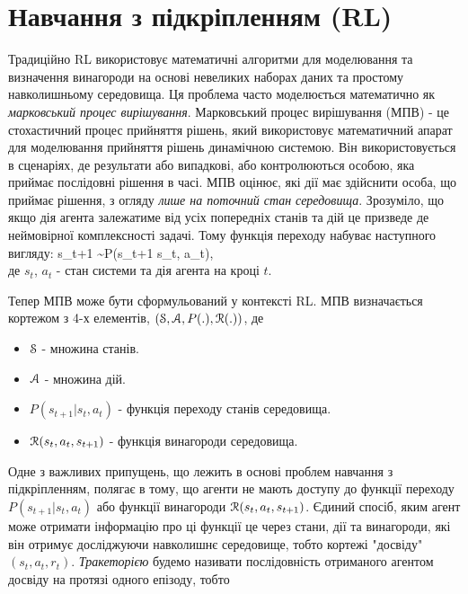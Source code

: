 \section{Навчання з підкріпленням (RL)}
  \setcounter{equation}{0}
 \setcounter{theorem}{0}
 \par  Традиційно RL використовує математичні алгоритми для моделювання та 
  визначення винагороди на основі невеликих наборах даних та простому навколишньому
  середовища. Ця проблема часто моделюється ма\-те\-ма\-тич\-но як {\em марковський процес 
  вирішування}. Марковський процес вирішування (МПВ) - 
  це стохастичний процес прийняття рішень, який використовує математичний 
  апарат для моделювання прийняття рішень динамічною системою. 
  Він використовується в сценаріях, де результати або випадкові, або 
  контролюються особою, яка приймає послідовні рішення в 
  часі. МПВ оцінює, які дії має здійснити особа, що приймає рішення, з огляду
  {\em лише на поточний стан середовища}. Зрозуміло, що якщо дія агента залежатиме від 
  усіх попередніх станів та дій це призведе де неймовірної комплексності задачі. Тому 
  функ\-ція переходу набуває наступного вигляду:
  s_{t+1} \sim P(s_{t+1} \vert s_{t}, a_{t}),
  \eq
  \\ де $s_{t}$, $a_{t}$ - стан системи та дія агента  на кроці $t$.
  \par Тепер МПВ може бути сформульований у контексті RL. МПВ визначається
  кортежом з 4-х елементів, $(\EuScript{S, A}, P(.), \EuScript{R(.)})$, де
  \begin{itemize}
    \item $\EuScript{S}$ - множина станів. 
    \item $\EuScript{A}$ - множина дій. 
    \item $P(s_{t+1} \vert s_{t}, a_{t})$ - функція переходу станів середовища.
    \item ${\EuScript{R}(s_t,a_t,s_{t+1})}$ - функ\-ція винагороди середовища.
  \end{itemize} 
  Одне з важливих припущень, що лежить в основі проблем навчання з підкріпленням, полягає в тому, 
  що агенти не мають доступу до функції переходу $P(s_{t+1} \vert s_{t}, a_{t})$ або функції винагороди 
  ${\EuScript{R}(s_t,a_t,s_{t+1})}$. Єдиний спосіб, яким агент може отримати інформацію про ці функції це через
  стани, дії та винагороди, які він отримує досліджуючи навколишнє середовище, тобто кортежі "досвіду" $(s_t, a_t, r_t)$.
  {\em Тракеторією} будемо називати послідовність отриманого агентом досвіду на протязі одного епізоду, тобто 
